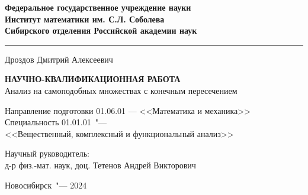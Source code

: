 \thispagestyle{empty}
\begin{center}
\textbf{
Федеральное государственное учреждение науки\\
Институт математики им. С.Л. Соболева\\
Сибирского отделения Российской академии наук}
\end{center}

\noindent\rule{\textwidth}{1pt} %

\vspace{0pt plus4fill}

\begin{center}
{%
Дроздов Дмитрий Алексеевич}
\end{center}

\vspace{0pt plus1fill}

\begin{center}
\textbf {\large %
НАУЧНО-КВАЛИФИКАЦИОННАЯ РАБОТА}\\
{\large Анализ на самоподобных множествах с конечным пересечением}
\end{center}

\vspace{0pt plus2fill} 

{%
\noindent 
Направление подготовки 01.06.01 --- <<Математика и механика>>\\
Специальность 01.01.01\ "---\\
<<Вещественный, комплексный и функциональный анализ>>}


\vspace{0pt plus2fill}

\noindent
Научный руководитель:\\
д-р физ.-мат. наук, доц. Тетенов Андрей Викторович


\vspace{0pt plus4fill}
{\centering Новосибирск\ "--- 2024\par}